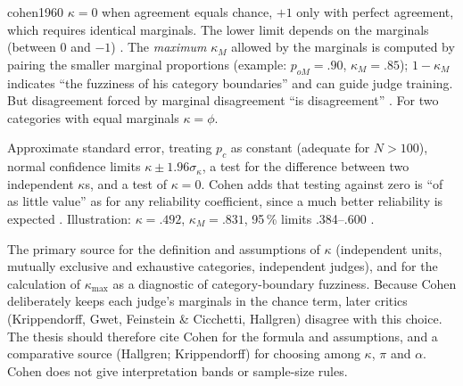\begin{papercard}{cohen1960}
 $\kappa=0$ when agreement equals chance, $+1$ only with perfect agreement, which requires identical marginals. The lower limit depends on the marginals (between 0 and $-1$) . The \emph{maximum} $\kappa_M$ allowed by the marginals is computed by pairing the smaller marginal proportions (example: $p_{oM}=.90$, $\kappa_M=.85$); $1-\kappa_M$ indicates ``the fuzziness of his category boundaries'' and can guide judge training. But disagreement forced by marginal disagreement ``is disagreement'' . For two categories with equal marginals $\kappa=\phi$.

 Approximate standard error, treating $p_c$ as constant (adequate for $N>100$), normal confidence limits $\kappa\pm1.96\sigma_\kappa$, a test for the difference between two independent $\kappa$s, and a test of $\kappa=0$. Cohen adds that testing against zero is ``of as little value'' as for any reliability coefficient, since a much better reliability is expected . Illustration: $\kappa=.492$, $\kappa_M=.831$, 95\,\% limits .384--.600 .

 The primary source for the definition and assumptions of $\kappa$ (independent units, mutually exclusive and exhaustive categories, independent judges), and for the calculation of $\kappa_{\max}$ as a diagnostic of category-boundary fuzziness. Because Cohen deliberately keeps each judge's marginals in the chance term, later critics (Krippendorff, Gwet, Feinstein \& Cicchetti, Hallgren) disagree with this choice. The thesis should therefore cite Cohen for the formula and assumptions, and a comparative source (Hallgren; Krippendorff) for choosing among $\kappa$, $\pi$ and $\alpha$. Cohen does not give interpretation bands or sample-size rules.
\end{papercard}
